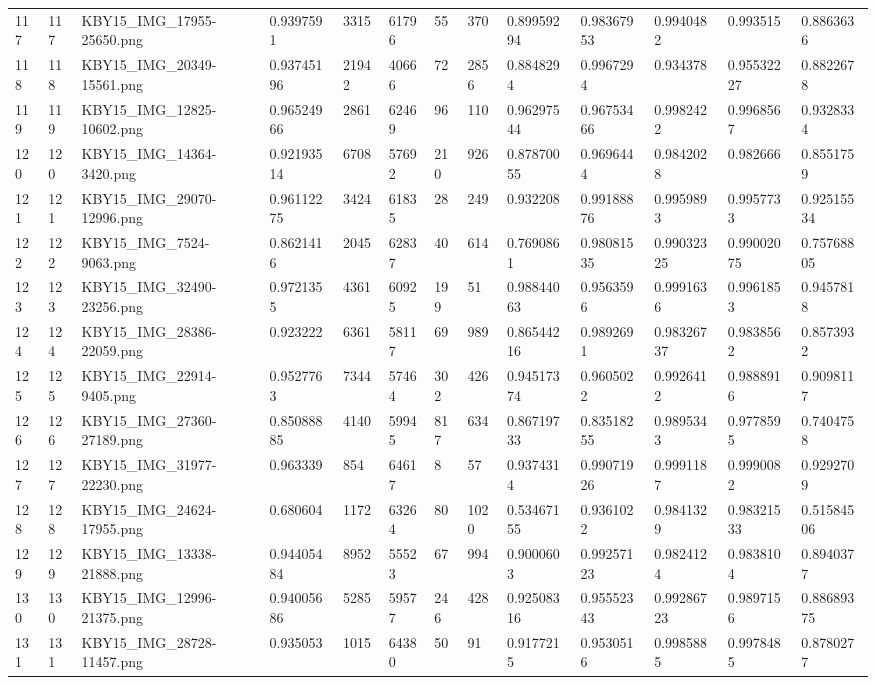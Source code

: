 \documentclass[11pt, a4paper, twoside]{report}
\begin{document}
\begin{longtable}[c]{@{}lllllllllllll@{}}
117 & 117 & KBY15\_IMG\_17955-25650.png & 0.9397591 & 3315 & 61796 & 55 & 370 & 0.89959294 & 0.98367953 & 0.9940482 & 0.993515 & 0.8863636 \\
118 & 118 & KBY15\_IMG\_20349-15561.png & 0.93745196 & 21942 & 40666 & 72 & 2856 & 0.8848294 & 0.9967294 & 0.934378 & 0.95532227 & 0.8822678 \\
119 & 119 & KBY15\_IMG\_12825-10602.png & 0.96524966 & 2861 & 62469 & 96 & 110 & 0.96297544 & 0.96753466 & 0.9982422 & 0.9968567 & 0.9328334 \\
120 & 120 & KBY15\_IMG\_14364-3420.png & 0.92193514 & 6708 & 57692 & 210 & 926 & 0.87870055 & 0.9696444 & 0.9842028 & 0.982666 & 0.8551759 \\
121 & 121 & KBY15\_IMG\_29070-12996.png & 0.96112275 & 3424 & 61835 & 28 & 249 & 0.932208 & 0.99188876 & 0.9959893 & 0.9957733 & 0.92515534 \\
122 & 122 & KBY15\_IMG\_7524-9063.png & 0.8621416 & 2045 & 62837 & 40 & 614 & 0.7690861 & 0.98081535 & 0.99032325 & 0.99002075 & 0.75768805 \\
123 & 123 & KBY15\_IMG\_32490-23256.png & 0.9721355 & 4361 & 60925 & 199 & 51 & 0.98844063 & 0.9563596 & 0.9991636 & 0.9961853 & 0.9457818 \\
124 & 124 & KBY15\_IMG\_28386-22059.png & 0.923222 & 6361 & 58117 & 69 & 989 & 0.86544216 & 0.9892691 & 0.98326737 & 0.9838562 & 0.8573932 \\
125 & 125 & KBY15\_IMG\_22914-9405.png & 0.9527763 & 7344 & 57464 & 302 & 426 & 0.94517374 & 0.9605022 & 0.9926412 & 0.9888916 & 0.9098117 \\
126 & 126 & KBY15\_IMG\_27360-27189.png & 0.85088885 & 4140 & 59945 & 817 & 634 & 0.86719733 & 0.83518255 & 0.9895343 & 0.9778595 & 0.7404758 \\
127 & 127 & KBY15\_IMG\_31977-22230.png & 0.963339 & 854 & 64617 & 8 & 57 & 0.9374314 & 0.99071926 & 0.9991187 & 0.9990082 & 0.9292709 \\
128 & 128 & KBY15\_IMG\_24624-17955.png & 0.680604 & 1172 & 63264 & 80 & 1020 & 0.53467155 & 0.9361022 & 0.9841329 & 0.98321533 & 0.51584506 \\
129 & 129 & KBY15\_IMG\_13338-21888.png & 0.94405484 & 8952 & 55523 & 67 & 994 & 0.9000603 & 0.99257123 & 0.9824124 & 0.9838104 & 0.8940377 \\
130 & 130 & KBY15\_IMG\_12996-21375.png & 0.94005686 & 5285 & 59577 & 246 & 428 & 0.92508316 & 0.95552343 & 0.99286723 & 0.9897156 & 0.88689375 \\
131 & 131 & KBY15\_IMG\_28728-11457.png & 0.935053 & 1015 & 64380 & 50 & 91 & 0.9177215 & 0.9530516 & 0.9985885 & 0.9978485 & 0.8780277 \\

\end{longtable}
\end{document}
